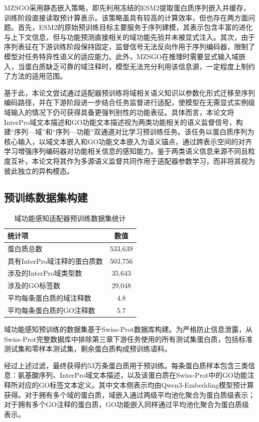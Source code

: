 MZSGO采用静态嵌入策略，即先利用冻结的ESM2提取蛋白质序列嵌入并缓存，训练阶段直接读取预计算表示。该策略虽具有较高的计算效率，但也存在两方面问题。首先，ESM2的原始预训练目标主要服务于序列建模，其表示包含丰富的进化与上下文信息，但与功能预测直接相关的域功能先验并未被显式注入。其次，由于序列表征在下游训练阶段保持固定，监督信号无法反向作用于序列编码器，限制了模型对任务特异性语义的适应能力。此外，MZSGO在推理时需要显式输入域嵌入，当蛋白质缺乏可靠的域注释时，模型无法充分利用该信息源，一定程度上制约了方法的适用范围。

基于此，本论文尝试通过适配器预训练将域相关语义知识以参数化形式迁移至序列编码路径，并在下游阶段进一步结合任务监督进行适配，使模型在无需显式实例级域输入的情况下仍可获得具备更强判别性的功能表征。具体而言，本论文将InterPro域文本描述和GO功能文本描述视为两类功能相关的语义监督信号，构建“序列—域”和“序列—功能”双通道对比学习预训练任务。该任务以蛋白质序列为核心输入，以域文本嵌入和GO功能文本嵌入为语义锚点，通过跨表示空间的对齐学习增强序列编码器对功能相关信息的感知能力。鉴于两类语义信息来源不同且粒度互补，本论文将其作为多源语义监督共同作用于适配器参数学习，而非将其视为彼此独立的异构模态。

\subsection{预训练数据集构建}
\begin{table}[htbp]
\centering
\caption{域功能感知适配器预训练数据集统计}
\label{tab:pretrain_data}
\small
\begin{tabular}{lc}
\toprule
统计项 & 数值 \\
\midrule
蛋白质总数 & 533,639 \\
具有InterPro域注释的蛋白质数 & 503,756 \\
涉及的InterPro域类型数 & 35,643 \\
涉及的GO标签数 & 29,048 \\
平均每条蛋白质的域注释数 & 4.8 \\
平均每条蛋白质的GO注释数 & 5.7 \\
\bottomrule
\end{tabular}
\end{table}

域功能感知预训练的数据集基于Swiss-Prot数据库构建。为严格防止信息泄露，从Swiss-Prot完整数据库中排除第三章下游任务使用的所有测试集蛋白质，包括标准测试集和零样本测试集，剩余蛋白质构成预训练语料。

经过上述过滤，最终获得约53万条蛋白质用于预训练。每条蛋白质样本包含三类信息：氨基酸序列、InterPro域文本描述，以及该蛋白质在Swiss-Prot中的GO功能注释所对应的GO标签文本定义。其中文本侧表示均由Qwen3-Embedding模型预计算获得。对于拥有多个域的蛋白质，域嵌入通过两级平均池化聚合为蛋白质级表示；对于拥有多个GO注释的蛋白质，GO功能嵌入同样通过平均池化聚合为蛋白质级表示。

